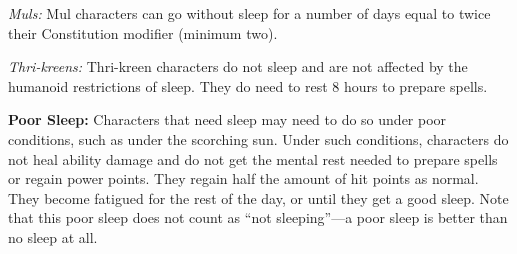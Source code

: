 \textit{Muls:} Mul characters can go without sleep for a number of days equal to twice their Constitution modifier (minimum two).

\textit{Thri-kreens:} Thri-kreen characters do not sleep and are not affected by the humanoid restrictions of sleep. They do need to rest 8 hours to prepare spells.

\textbf{Poor Sleep:} Characters that need sleep may need to do so under poor conditions, such as under the scorching sun. Under such conditions, characters do not heal ability damage and do not get the mental rest needed to prepare spells or regain power points. They regain half the amount of hit points as normal. They become fatigued for the rest of the day, or until they get a good sleep. Note that this poor sleep does not count as ``not sleeping''---a poor sleep is better than no sleep at all.